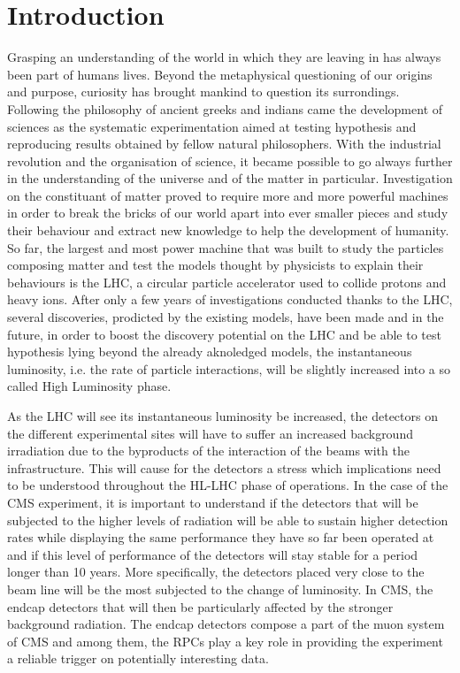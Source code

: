 \renewcommand\evenpagerightmark{{\scshape\small Chapter 1}}
\renewcommand\oddpageleftmark{{\scshape\small Introduction}}

\renewcommand{\bibname}{References}

\hyphenation{}

\chapter[Introduction]%
{Introduction}
\label{chap:intro}

Grasping an understanding of the world in which they are leaving in has always been part of humans lives. Beyond the metaphysical questioning of our origins and purpose, curiosity has brought mankind to question its surrondings. Following the philosophy of ancient greeks and indians came the development of sciences as the systematic experimentation aimed at testing hypothesis and reproducing results obtained by fellow natural philosophers. With the industrial revolution and the organisation of science, it became possible to go always further in the understanding of the universe and of the matter in particular. Investigation on the constituant of matter proved to require more and more powerful machines in order to break the bricks of our world apart into ever smaller pieces and study their behaviour and extract new knowledge to help the development of humanity. So far, the largest and most power machine that was built to study the particles composing matter and test the models thought by physicists to explain their behaviours is the \acf{LHC}, a circular particle accelerator used to collide protons and heavy ions. After only a few years of investigations conducted thanks to the LHC, several discoveries, prodicted by the existing models, have been made and in the future, in order to boost the discovery potential on the LHC and be able to test hypothesis lying beyond the already aknoledged models, the instantaneous luminosity, i.e. the rate of particle interactions, will be slightly increased into a so called High Luminosity phase.

As the \acl{LHC} will see its instantaneous luminosity be increased, the detectors on the different experimental sites will have to suffer an increased background irradiation due to the byproducts of the interaction of the beams with the infrastructure. This will cause for the detectors a stress which implications need to be understood throughout the \acf{HL-LHC} phase of operations. In the case of the \acf{CMS} experiment, it is important to understand if the detectors that will be subjected to the higher levels of radiation will be able to sustain higher detection rates while displaying the same performance they have so far been operated at and if this level of performance of the detectors will stay stable for a period longer than 10 years. More specifically, the detectors placed very close to the beam line will be the most subjected to the change of luminosity. In CMS, the endcap detectors that will then be particularly affected by the stronger background radiation. The endcap detectors compose a part of the muon system of CMS and among them, the \acf{RPC}s play a key role in providing the experiment a reliable trigger on potentially interesting data.


